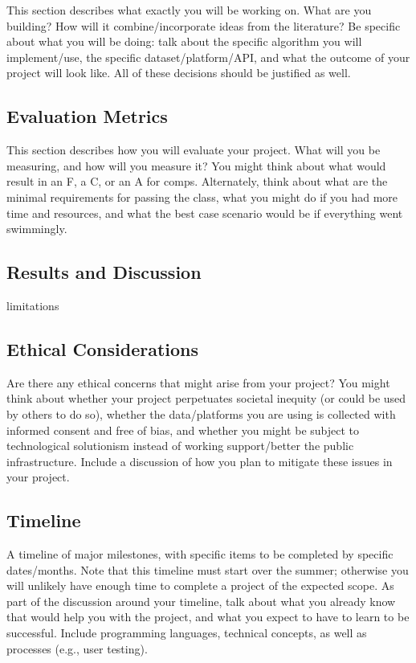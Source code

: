 \documentclass[10pt,twocolumn]{article}
\begin{document}
This section describes what exactly you will be working on.
What are you building? How will it combine/incorporate ideas from the literature? Be specific about what you will be doing: talk about the specific algorithm you will implement/use, the specific dataset/platform/API, and what the outcome of your project will look like.
All of these decisions should be justified as well.

\subsection{Evaluation Metrics}

This section describes how you will evaluate your project.
What will you be measuring, and how will you measure it?
You might think about what would result in an F, a C, or an A for comps.
Alternately, think about what are the minimal requirements for passing the class, what you might do if you had more time and resources, and what the best case scenario would be if everything went swimmingly.

\subsection{Results and Discussion}

limitations

\subsection{Ethical Considerations}

Are there any ethical concerns that might arise from your project?
You might think about whether your project perpetuates societal inequity (or could be used by others to do so), whether the data/platforms you are using is collected with informed consent and free of bias, and whether you might be subject to technological solutionism instead of working support/better the public infrastructure.
Include a discussion of how you plan to mitigate these issues in your project.

\subsection{Timeline}

A timeline of major milestones, with specific items to be completed by specific dates/months.
Note that this timeline must start over the summer; otherwise you will unlikely have enough time to complete a project of the expected scope.
As part of the discussion around your timeline, talk about what you already know that would help you with the project, and what you expect to have to learn to be successful.
Include programming languages, technical concepts, as well as processes (e.g., user testing).
\end{document}
